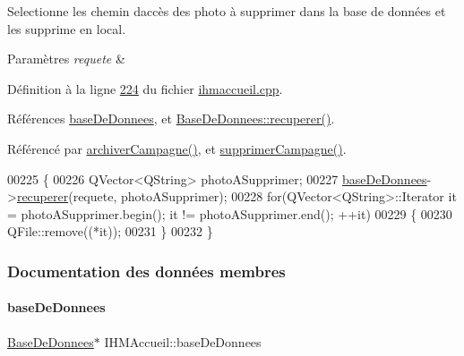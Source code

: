 Selectionne les chemin d\textquotesingle{}accès des photo à supprimer dans la base de données et les supprime en local. 


\begin{DoxyParams}{Paramètres}
{\em requete} & \\
\hline
\end{DoxyParams}


Définition à la ligne \hyperlink{ihmaccueil_8cpp_source_l00224}{224} du fichier \hyperlink{ihmaccueil_8cpp_source}{ihmaccueil.\+cpp}.



Références \hyperlink{ihmaccueil_8h_source_l00040}{base\+De\+Donnees}, et \hyperlink{basededonnees_8cpp_source_l00139}{Base\+De\+Donnees\+::recuperer()}.



Référencé par \hyperlink{ihmaccueil_8cpp_source_l00350}{archiver\+Campagne()}, et \hyperlink{ihmaccueil_8cpp_source_l00375}{supprimer\+Campagne()}.


\begin{DoxyCode}
00225 \{
00226     QVector<QString> photoASupprimer;
00227     \hyperlink{class_i_h_m_accueil_ab56d9846c071396a92f88272880e2c1f}{baseDeDonnees}->\hyperlink{class_base_de_donnees_a77539baad389f5acf754cd2cd452403e}{recuperer}(requete, photoASupprimer);
00228     \textcolor{keywordflow}{for}(QVector<QString>::Iterator it = photoASupprimer.begin(); it != photoASupprimer.end(); ++it)
00229     \{
00230        QFile::remove((*it));
00231     \}
00232 \}
\end{DoxyCode}


\subsubsection{Documentation des données membres}
\mbox{\label{class_i_h_m_accueil_ab56d9846c071396a92f88272880e2c1f}} 
\paragraph{\texorpdfstring{base\+De\+Donnees}{baseDeDonnees}}
{\footnotesize\ttfamily \hyperlink{class_base_de_donnees}{Base\+De\+Donnees}$\ast$ I\+H\+M\+Accueil\+::base\+De\+Donnees\hspace{0.3cm}{\ttfamily [private]}}



